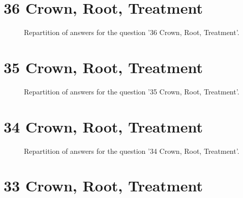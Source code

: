 \documentclass[12pt]{article}
\begin{document}
\clearpage{}
\section{36
Crown, Root, Treatment}

\label{sec:54}


\begin{figure}[h!]
    \caption{\label{figure:q54-1}Repartition of answers for the question '36
Crown, Root, Treatment'.}
\end{figure}



\clearpage{}
\section{35
Crown, Root, Treatment}

\label{sec:53}


\begin{figure}[h!]
    \caption{\label{figure:q53-1}Repartition of answers for the question '35
Crown, Root, Treatment'.}
\end{figure}



\clearpage{}
\section{34
Crown, Root, Treatment}

\label{sec:52}


\begin{figure}[h!]
    \caption{\label{figure:q52-1}Repartition of answers for the question '34
Crown, Root, Treatment'.}
\end{figure}



\clearpage{}
\section{33
Crown, Root, Treatment}
\end{document}
